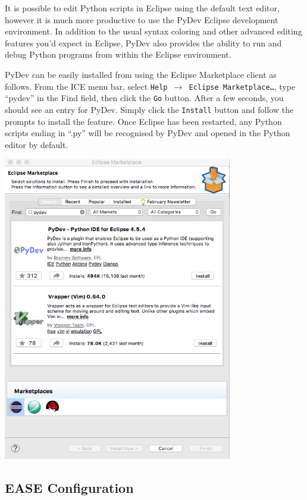\documentclass{article}
\begin{document}
It is possible to edit Python scripts in Eclipse using the default text editor,
however it is much more productive to use the PyDev Eclipse development
environment. In addition to the usual syntax coloring and other advanced editing
features you'd expect in Eclipse, PyDev also provides the ability to run and
debug Python programs from within the Eclipse environment.

PyDev can be easily installed from using the Eclipse Marketplace client as
follows. From the ICE menu bar, select \texttt{Help $\rightarrow$ Eclipse
Marketplace\ldots}, type ``pydev'' in the Find field, then click the \texttt{Go}
button.
After a few seconds, you should see an entry for PyDev. Simply click the
\texttt{Install} button and follow the prompts to install the feature. Once
Eclipse has been restarted, any Python scripts ending in ``.py'' will be recognised by
PyDev and opened in the Python editor by default.

\begin{center}
\includegraphics[width=10cm]{images/pydev-marketplace}
\end{center}

\subsection{EASE Configuration}
\end{document}
